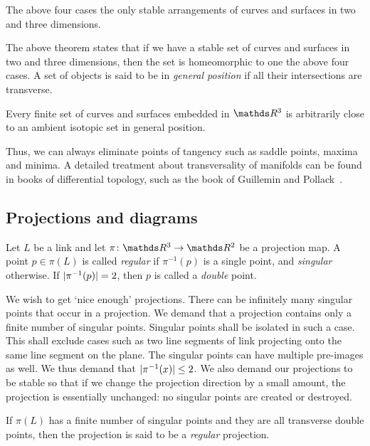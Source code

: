 \begin{thm}
    The above four cases the only stable arrangements of curves and surfaces in two and three dimensions.
\end{thm}

The above theorem states that if we have a stable set of curves and surfaces in two and three dimensions, then the set is homeomorphic to one the above four cases. A set of objects is said to be in \textit{general position} if all their intersections are transverse.

\begin{thm}
    Every finite set of curves and surfaces embedded in \(\R^3\) is arbitrarily close to an ambient isotopic set in general position.
\end{thm}

Thus, we can always eliminate points of tangency such as saddle points, maxima and minima. A detailed treatment about transversality of manifolds can be found in books of differential topology, such as the book of Guillemin and Pollack~\cite{pollack}.

\subsection{Projections and diagrams}

Let \(L\) be a link and let \(\pi \colon \rthree \rightarrow \rtwo\) be a projection map. A point \(p \in \pi(L)\) is called \textit{regular} if \(\pi^{-1}(p)\) is a single point, and \textit{singular} otherwise. If \(\lvert\pi^{-1}(p)\rvert = 2\), then \(p\) is called a \textit{double} point.

We wish to get `nice enough' projections. There can be infinitely many singular points that occur in a projection. We demand that a projection contains only a finite number of singular points. Singular points shall be isolated in such a case. This shall exclude cases such as two line segments of link projecting onto the same line segment on the plane. The singular points can have multiple pre-images as well. We thus demand that \(\lvert\pi^{-1} (x)\rvert \leq 2\). We also demand our projections to be stable so that if we change the projection direction by a small amount, the projection is essentially unchanged: no singular points are created or destroyed.

\begin{defn}
    If \(\pi(L)\) has a finite number of singular points and they are all transverse double points, then the projection is said to be a \textit{regular} projection.
\end{defn}

